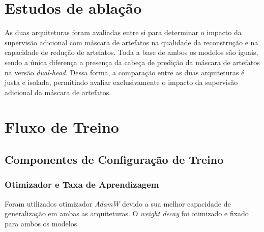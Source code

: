 
\section{Estudos de ablação}

As duas arquiteturas foram avaliadas entre si para determinar o impacto da supervisão adicional com máscara de artefatos na qualidade da reconstrução e na capacidade de redução de artefatos. Toda a base de ambos os modelos são iguais, sendo a única diferença a presença da cabeça de predição da máscara de artefatos na versão \textit{dual-head}. Dessa forma, a comparação entre as duas arquiteturas é justa e isolada, permitindo avaliar exclusivamente o impacto da supervisão adicional da máscara de artefatos.


\section{Fluxo de Treino}

\subsection{Componentes de Configuração de Treino}


\subsubsection{Otimizador e Taxa de Aprendizagem}
Foram utilizados otimizador \textit{AdamW} devido a sua melhor capacidade de generalização \cite{loshchilovDecoupledWeightDecay2019} em ambas as arquiteturas. O \textit{weight decay} foi otimizado e fixado para ambos os modelos.

